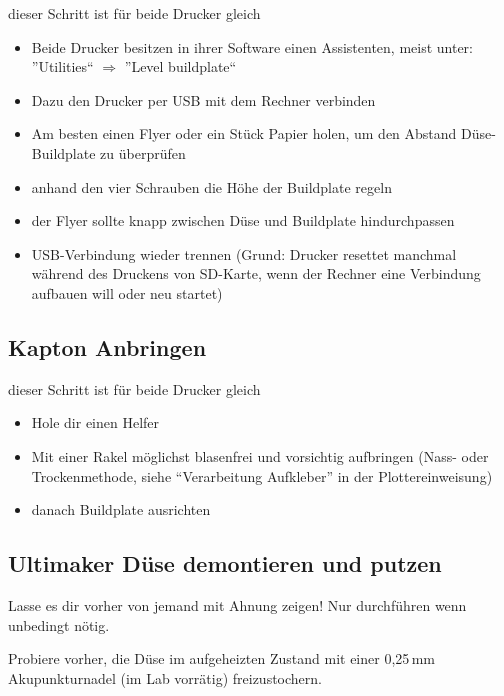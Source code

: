 \documentclass{\basedir/fablab-document}
\begin{document}
dieser Schritt ist für beide Drucker gleich
\begin{itemize}
\item Beide Drucker besitzen in ihrer Software einen Assistenten, meist unter: ''Utilities`` $\Rightarrow$ ''Level buildplate``
\item Dazu den Drucker per USB mit dem Rechner verbinden
\item Am besten einen Flyer oder ein Stück Papier holen, um den Abstand Düse-Buildplate zu überprüfen
\item anhand den vier Schrauben die Höhe der Buildplate regeln
\item der Flyer sollte knapp zwischen Düse und Buildplate hindurchpassen
\item USB-Verbindung wieder trennen (Grund: Drucker resettet manchmal während des Druckens von SD-Karte, wenn der Rechner eine Verbindung aufbauen will oder neu startet)
\end{itemize}

\subsection{Kapton Anbringen}

dieser Schritt ist für beide Drucker gleich
\begin{itemize}
\item Hole dir einen Helfer
\item Mit einer Rakel möglichst blasenfrei und vorsichtig aufbringen (Nass- oder Trockenmethode, siehe \enquote{Verarbeitung Aufkleber} in der Plottereinweisung)
\item danach Buildplate ausrichten
\end{itemize}

\subsection{Ultimaker Düse demontieren und putzen}
Lasse es dir vorher von jemand mit Ahnung zeigen! Nur durchführen wenn unbedingt nötig.

Probiere vorher, die Düse im aufgeheizten Zustand mit einer 0,25\,mm Akupunkturnadel (im Lab vorrätig) freizustochern.
\end{document}
